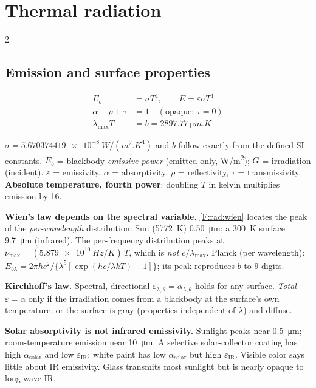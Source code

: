 \section{Thermal radiation}\label{sec:radiation}
\begin{multicols}{2}
\subsection{Emission and surface properties}\label{sec:emission}
\CORE{}
\begin{formulabox}
\vspace{-6pt}
\begin{align}
E_b &= \sigma T^4,\qquad E=\varepsilon\sigma T^4 \label{F:rad:sb}\\
\alpha+\rho+\tau &= 1\quad(\text{opaque: }\tau=0) \label{F:rad:arho}\\
\lambda_{\max}T &= b = \SI{2897.77}{\micro m.K} \label{F:rad:wien}
\end{align}
\end{formulabox}
$\sigma=\SI{5.670374419e-8}{W/(m^2.K^4)}$ and $b$ follow exactly from the defined SI constants. $E_b$ = blackbody \emph{emissive power} (emitted only, \si{W/m^2}); $G$ = irradiation (incident). $\varepsilon$ = emissivity, $\alpha$ = absorptivity, $\rho$ = reflectivity, $\tau$ = transmissivity. \textbf{Absolute temperature, fourth power}: doubling $T$ in kelvin multiplies emission by 16.

\textbf{Wien's law depends on the spectral variable.} \eqref{F:rad:wien} locates the peak of the \emph{per-wavelength} distribution: Sun (\SI{5772}{K}) \SI{0.50}{\micro m}; a \SI{300}{K} surface \SI{9.7}{\micro m} (infrared). The per-frequency distribution peaks at $\nu_{\max}=(\SI{5.879e10}{Hz/K})\,T$, which is \emph{not} $c/\lambda_{\max}$. Planck (per wavelength): $E_{b\lambda}=2\pi hc^2/\{\lambda^5[\exp(hc/\lambda kT)-1]\}$; its peak reproduces $b$ to 9 digits.

\textbf{Kirchhoff's law.} Spectral, directional $\varepsilon_{\lambda,\theta}=\alpha_{\lambda,\theta}$ holds for any surface. \emph{Total} $\varepsilon=\alpha$ only if the irradiation comes from a blackbody at the surface's own temperature, or the surface is gray (properties independent of $\lambda$) and diffuse.

\begin{trapbox}\textbf{Solar absorptivity is not infrared emissivity.} Sunlight peaks near \SI{0.5}{\micro m}; room-temperature emission near \SI{10}{\micro m}. A selective solar-collector coating has high $\alpha_{\text{solar}}$ and low $\varepsilon_{\text{IR}}$; white paint has low $\alpha_{\text{solar}}$ but high $\varepsilon_{\text{IR}}$. Visible color says little about IR emissivity. Glass transmits most sunlight but is nearly opaque to long-wave IR.\end{trapbox}


\end{multicols}
